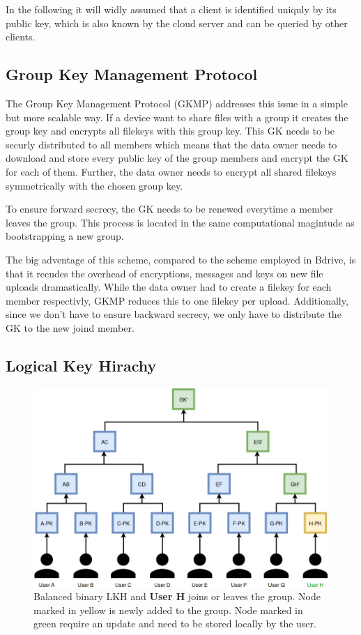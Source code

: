 In the following it will widly assumed that a client is identified uniquly by its public key, which is also known by the cloud server and can be queried by other clients. 

\subsection{Group Key Management Protocol}
The Group Key Management Protocol (GKMP)\cite{harney1997group} addresses this issue in a simple but more scalable way. If a device want to share files with a group it creates the group key and encrypts all filekeys with this group key. This GK needs to be securly distributed to all members which means that the data owner needs to download and store every public key of the group members and encrypt the GK for each of them. Further, the data owner needs to encrypt all shared filekeys symmetrically with the chosen group key. 

To ensure forward secrecy, the GK needs to be renewed everytime a member leaves the group. This process is located in the same computational magintude as bootstrapping a new group. 

The big adventage of this scheme, compared to the scheme employed in Bdrive, is that it recudes the overhead of encryptions, messages and keys on new file uploads dramastically. While the data owner had to create a filekey for each member respectivly, GKMP reduces this to one filekey per upload. Additionally, since we don't have to ensure backward secrecy, we only have to distribute the GK to the new joind member.

\subsection{Logical Key Hirachy}
\begin{figure}[!ht]
\centering
    \includegraphics[width=0.8\linewidth]{img/LKH.png}
    \caption{Balanced binary LKH and \textbf{User H} joins or leaves the group. Node marked in yellow is newly added to the group. Node marked in green require an update and need to be stored locally by the user.}
    \label{fig:lkh}
\end{figure}

